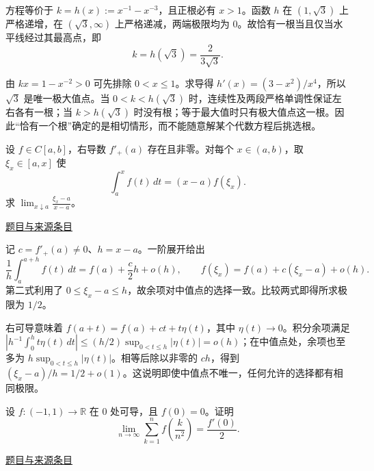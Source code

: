 \documentclass[12pt,fontset=fandol]{ctexart}
\begin{document}
\begin{solve}\label{ans:fin01-all:2}

方程等价于 $k=h(x):=x^{-1}-x^{-3}$，且正根必有 $x>1$。函数 $h$ 在 $(1,\sqrt3)$ 上严格递增，在 $(\sqrt3,\infty)$ 上严格递减，两端极限均为 $0$。故恰有一根当且仅当水平线经过其最高点，即
\[
k=h(\sqrt3)=\frac{2}{3\sqrt3}.
\]

由 $kx=1-x^{-2}>0$ 可先排除 $0<x\le1$。求导得 $h'(x)=(3-x^2)/x^4$，所以 $\sqrt3$ 是唯一极大值点。当 $0<k<h(\sqrt3)$ 时，连续性及两段严格单调性保证左右各有一根；当 $k>h(\sqrt3)$ 时没有根；等于最大值时只有极大值点这一根。因此“恰有一个根”确定的是相切情形，而不能随意解某个代数方程后挑选根。

\end{solve}

\begin{example}[来源序号3]\label{ex:fin01-all:3}\label{pr:fin01-all:3}

设 $f\in C[a,b]$，右导数 $f'_+(a)$ 存在且非零。对每个 $x\in(a,b)$，取 $\xi_x\in[a,x]$ 使
\[
\int_a^x f(t)\,dt=(x-a)f(\xi_x).
\]
求 $\displaystyle\lim_{x\downarrow a}\frac{\xi_x-a}{x-a}$。

\par\href{https://github.com/lzxcr/cmc-mathematics/blob/64916fa1fdbc3e444a652eca204d5669058ee321/src/problems/finals/01/03.md}{题目与来源条目}

\end{example}

\begin{solve}\label{ans:fin01-all:3}

记 $c=f'_+(a)\ne0$、$h=x-a$。一阶展开给出
\[
\frac1h\int_a^{a+h}f(t)\,dt=f(a)+\frac c2h+o(h),
\qquad
f(\xi_x)=f(a)+c(\xi_x-a)+o(h).
\]
第二式利用了 $0\le\xi_x-a\le h$，故余项对中值点的选择一致。比较两式即得所求极限为 $1/2$。

右可导意味着 $f(a+t)=f(a)+ct+t\eta(t)$，其中 $\eta(t)\to0$。积分余项满足 $|h^{-1}\int_0^h t\eta(t)\,dt|\le(h/2)\sup_{0<t\le h}|\eta(t)|=o(h)$；在中值点处，余项也至多为 $h\sup_{0<t\le h}|\eta(t)|$。相等后除以非零的 $ch$，得到 $(\xi_x-a)/h=1/2+o(1)$。这说明即使中值点不唯一，任何允许的选择都有相同极限。

\end{solve}

\begin{example}[来源序号5]\label{ex:fin01-all:5}\label{pr:fin01-all:5}

设 $f:(-1,1)\to\mathbb R$ 在 $0$ 处可导，且 $f(0)=0$。证明
\[
\lim_{n\to\infty}\sum_{k=1}^n f\!\left(\frac{k}{n^2}\right)=\frac{f'(0)}2.
\]

\par\href{https://github.com/lzxcr/cmc-mathematics/blob/64916fa1fdbc3e444a652eca204d5669058ee321/src/problems/finals/01/05.md}{题目与来源条目}

\end{example}
\end{document}
